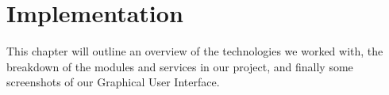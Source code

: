 \chapter{\centering Implementation}

This chapter will outline an overview of the technologies we worked with, the breakdown 
of the modules and services in our project, and finally some screenshots of our Graphical 
User Interface.






